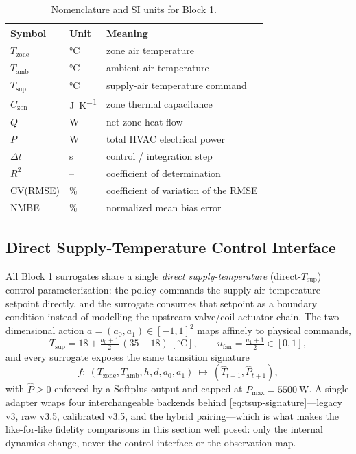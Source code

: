 \documentclass[11pt,a4paper]{article}
\newcommand{\Czon}{\ensuremath{C_{\mathrm{zon}}}}
\newcommand{\Tsupply}{\ensuremath{T_{\mathrm{sup}}}}
\newcommand{\That}{\ensuremath{\widehat{T}}}
\begin{document}
\begin{table}[H]
\centering
\small
\caption{Nomenclature and SI units for Block 1.}
\label{tab:nomenclature}
\begin{tabularx}{0.92\linewidth}{llX}
\toprule
Symbol & Unit & Meaning \\
\midrule
$T_{\mathrm{zone}}$ & \si{\celsius} & zone air temperature \\
$T_{\mathrm{amb}}$ & \si{\celsius} & ambient air temperature \\
$\Tsupply$ & \si{\celsius} & supply-air temperature command \\
$\Czon$ & \si{\joule\per\kelvin} & zone thermal capacitance \\
$\dot{Q}$ & \si{\watt} & net zone heat flow \\
$P$ & \si{\watt} & total HVAC electrical power \\
$\Delta t$ & \si{\second} & control / integration step \\
$R^2$ & -- & coefficient of determination \\
CV(RMSE) & \si{\percent} & coefficient of variation of the RMSE \\
NMBE & \si{\percent} & normalized mean bias error \\
\bottomrule
\end{tabularx}
\end{table}

\subsection{Direct Supply-Temperature Control Interface}
\label{ssec:block1-direct-tsup}

All Block 1 surrogates share a single \emph{direct supply-temperature} (direct-\Tsupply{}) control parameterization: the policy commands the supply-air temperature setpoint directly, and the surrogate consumes that setpoint as a boundary condition instead of modelling the upstream valve/coil actuator chain. The two-dimensional action \(a=(a_0,a_1)\in[-1,1]^2\) maps affinely to physical commands,
\begin{equation}
  \Tsupply = 18 + \tfrac{a_0+1}{2}\,(35-18)~[^\circ\mathrm{C}],
  \qquad
  u_{\mathrm{fan}} = \tfrac{a_1+1}{2}\in[0,1],
  \label{eq:action-map}
\end{equation}
and every surrogate exposes the same transition signature
\begin{equation}
  f:\ (T_{\mathrm{zone}},T_{\mathrm{amb}},h,d,a_0,a_1)\ \longmapsto\ (\That_{t+1},\widehat{P}_{t+1}),
  \label{eq:tsup-signature}
\end{equation}
with \(\widehat{P}\ge 0\) enforced by a Softplus output and capped at \(P_{\max}=5500~\mathrm{W}\). A single adapter wraps four interchangeable backends behind \eqref{eq:tsup-signature}---legacy v3, raw v3.5, calibrated v3.5, and the hybrid pairing---which is what makes the like-for-like fidelity comparisons in this section well posed: only the internal dynamics change, never the control interface or the observation map.
\end{document}
